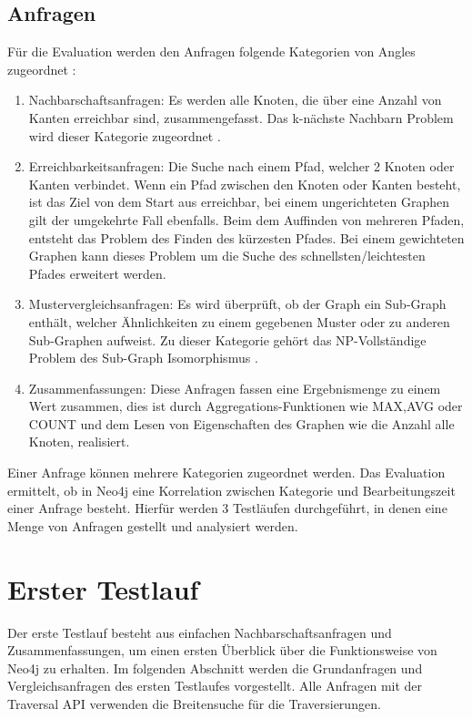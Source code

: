 \subsection{Anfragen} \label{Kategorien}
Für die Evaluation werden den Anfragen folgende Kategorien von Angles zugeordnet \parencite{angles2012comparison}:  
\begin{enumerate}
	\item Nachbarschaftsanfragen: Es werden alle Knoten, die über eine Anzahl von Kanten erreichbar sind, zusammengefasst. Das k-nächste Nachbarn Problem wird dieser Kategorie zugeordnet \parencite{papadopoulos2006nearest}. 
	\item Erreichbarkeitsanfragen: Die Suche nach einem Pfad, welcher 2 Knoten oder Kanten verbindet. Wenn ein Pfad zwischen den Knoten oder Kanten besteht, ist das Ziel von dem Start aus erreichbar, bei einem ungerichteten Graphen gilt der umgekehrte Fall ebenfalls. Beim dem Auffinden von mehreren Pfaden, entsteht das Problem des Finden des kürzesten Pfades. Bei einem gewichteten Graphen kann dieses Problem um die Suche des schnellsten/leichtesten Pfades  erweitert werden. 
	\item Mustervergleichsanfragen: Es wird überprüft, ob der Graph ein Sub-Graph enthält, welcher Ähnlichkeiten zu einem gegebenen Muster oder zu anderen Sub-Graphen aufweist. Zu dieser Kategorie gehört das NP-Vollständige Problem des Sub-Graph Isomorphismus \parencite{yannakakis1990graph}. 
	\item Zusammenfassungen: Diese Anfragen fassen eine Ergebnismenge zu einem Wert zusammen, dies ist durch Aggregations-Funktionen wie MAX,AVG oder COUNT und dem Lesen von Eigenschaften des Graphen wie die Anzahl alle Knoten, realisiert. 
\end{enumerate}
Einer Anfrage können mehrere Kategorien zugeordnet werden. Das Evaluation ermittelt, ob in Neo4j eine Korrelation zwischen Kategorie und Bearbeitungszeit einer Anfrage besteht. Hierfür werden 3 Testläufen durchgeführt, in denen eine Menge von Anfragen gestellt und analysiert werden. 
\section{Erster Testlauf}
Der erste Testlauf besteht aus einfachen Nachbarschaftsanfragen und Zusammenfassungen, um einen ersten Überblick über die Funktionsweise von Neo4j zu erhalten. Im folgenden Abschnitt werden die Grundanfragen und Vergleichsanfragen des ersten Testlaufes vorgestellt. Alle Anfragen mit der Traversal API verwenden die Breitensuche für die Traversierungen. 
